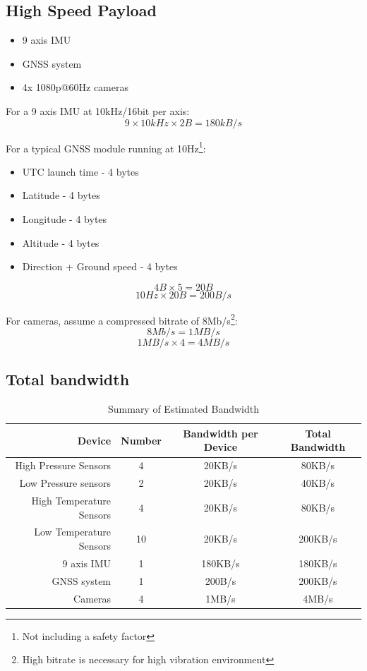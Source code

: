 \documentclass[12pt,article]{memoir}
\begin{document}
\subsection{High Speed Payload}
\begin{itemize}
\item 9 axis IMU
\item GNSS system
\item 4x 1080p@60Hz cameras
\end{itemize}

For a 9 axis IMU at 10kHz/16bit per axis:
\begin{equation}
	9 \times 10kHz \times 2B = 180kB/s
\end{equation}

For a typical GNSS module running at 10Hz\footnote{Not including a safety factor}:
\begin{itemize}
	\item UTC launch time - 4 bytes
	\item Latitude - 4 bytes
	\item Longitude - 4 bytes
	\item Altitude - 4 bytes
	\item Direction + Ground speed - 4 bytes
\end{itemize}
\begin{equation}
	4B \times 5 = 20B
\end{equation}
\begin{equation}
	10Hz \times 20B =200B/s
\end{equation}

For cameras, assume a compressed bitrate of 8Mb/s\footnote{High bitrate is necessary for high vibration environment}:
\begin{equation}
	8Mb/s = 1MB/s
\end{equation}
\begin{equation}
	1MB/s \times 4 = 4MB/s
\end{equation}

\subsection {Total bandwidth}
\begin{table}[H]
	\centering
	\begin{tabu}{r || c | c | c }
		Device & Number & Bandwidth per Device & Total Bandwidth\\ \hline
		High Pressure Sensors & 4 & 20KB/s & 80KB/s\\
		Low Pressure sensors & 2 & 20KB/s & 40KB/s\\
		High Temperature Sensors & 4 & 20KB/s & 80KB/s\\
		Low Temperature Sensors & 10 & 20KB/s & 200KB/s\\
		9 axis IMU & 1 & 180KB/s & 180KB/s\\
		GNSS system & 1 & 200B/s & 200KB/s\\
		Cameras & 4 & 1MB/s & 4MB/s
	\end{tabu}
	\caption{Summary of Estimated Bandwidth}
	\label{tab:bandwidth}
\end{table}
\end{document}
